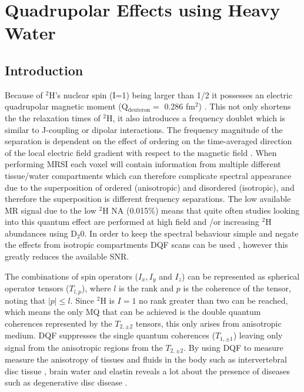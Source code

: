 \chapter{Quadrupolar Effects using Heavy Water}
\label{Chap:Quad}

\section{Introduction}

Because of $^2$H's nuclear spin (I=1) being larger than 1/2 it possesses an electric quadrupolar magnetic moment (Q$_{\text{deuteron}}=$ 0.286 fm$^2$)  \cite{Stone2015NuclearData}. This not only shortens the the relaxation times of $^2$H, it also introduces a frequency doublet which is similar to J-coupling or dipolar interactions. The frequency magnitude of the separation is dependent on the effect of ordering on the time-averaged direction of the local electric field gradient with respect to the magnetic field \cite{Seelig1977DeuteriumMembranes, Eliav2016MultipleMRS}. When performing \ac{MRSI} each voxel will contain information from multiple different tissue/water compartments which can therefore complicate spectral appearance due to the superposition of ordered (anisotropic) and disordered (isotropic), and therefore the superposition is different frequency separations. The low available MR signal due to the low $^2$H \ac{NA} (0.015\%) means that quite often studies looking into this quantum effect are performed at high field  \cite{Gursan2022ResidualMuscle} and \cite{Ooms2015DoubleTissue}/or \cite{Damion2022DoubleLoading} increasing $^2$H abundances using D$_2$0. In order to keep the spectral behaviour simple and negate the effects from isotropic compartments \ac{DQF} scans can be used \cite{Sharf1995DetectionNMR-Spectroscopy, Perea20072HDisc}, however this greatly reduces the available \ac{SNR}. 

The combinations of spin operators ($I_x, I_y$ and $I_z$) can be represented as spherical operator tensors ($T_{l,p}$), where $l$ is the rank and $p$ is the coherence of the tensor, noting that $|p| \le l$. Since $^2$H is $I=1$ no rank greater than two can be reached, which means the only \ac{MQ} that can be achieved is the double quantum coherences represented by the $T_{2,\pm2}$ tensors, this only arises from anisotropic medium. \ac{DQF} suppresses the single quantum coherences ($T_{1,\pm1}$) leaving only signal from the anisotropic regions from the $T_{2,\pm2}$. By using \ac{DQF} to measure measure the anisotropy of tissues and fluids in the body such as intervertebral disc tissue  \cite{Ooms2015DoubleTissue}, brain water \cite{Assaf1997InSpectroscopy} and elastin \cite{Sun2010InvestigationNMR} reveals a lot about the presence of diseases such as degenerative disc disease \cite{Ooms2015DoubleTissue}.


